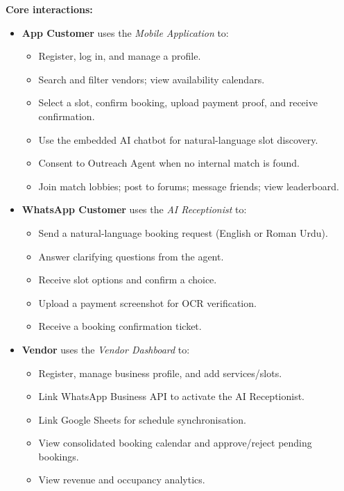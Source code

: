 \textbf{Core interactions:}
\begin{itemize}
  \item \textbf{App Customer} uses the \textit{Mobile Application} to:
    \begin{itemize}
      \item Register, log in, and manage a profile.
      \item Search and filter vendors; view availability calendars.
      \item Select a slot, confirm booking, upload payment proof, and receive confirmation.
      \item Use the embedded AI chatbot for natural-language slot discovery.
      \item Consent to Outreach Agent when no internal match is found.
      \item Join match lobbies; post to forums; message friends; view leaderboard.
    \end{itemize}
  \item \textbf{WhatsApp Customer} uses the \textit{AI Receptionist} to:
    \begin{itemize}
      \item Send a natural-language booking request (English or Roman Urdu).
      \item Answer clarifying questions from the agent.
      \item Receive slot options and confirm a choice.
      \item Upload a payment screenshot for OCR verification.
      \item Receive a booking confirmation ticket.
    \end{itemize}
  \item \textbf{Vendor} uses the \textit{Vendor Dashboard} to:
    \begin{itemize}
      \item Register, manage business profile, and add services/slots.
      \item Link WhatsApp Business API to activate the AI Receptionist.
      \item Link Google Sheets for schedule synchronisation.
      \item View consolidated booking calendar and approve/reject pending bookings.
      \item View revenue and occupancy analytics.
    \end{itemize}
\end{itemize}

